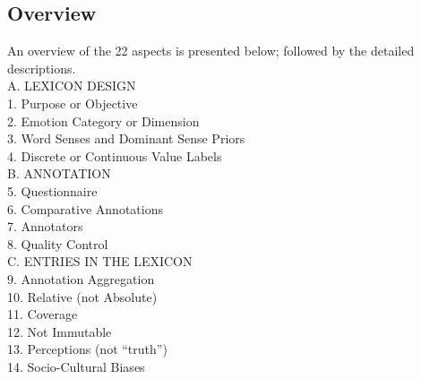 \documentclass[11pt]{article}
\begin{document}
\subsection{Overview}

\noindent An overview of the 22 aspects is presented below; followed by the detailed descriptions.\\[-10pt] %

\noindent A. LEXICON DESIGN\\[2pt]
\hspace*{3mm}  1. Purpose or Objective\\
\hspace*{3mm}  2. Emotion Category or Dimension\\
\hspace*{3mm}  3. Word Senses and Dominant Sense Priors\\
\hspace*{3mm}  4. Discrete or Continuous Value Labels\\[4pt]
\noindent B. ANNOTATION\\[2pt]
\hspace*{3mm}  5. Questionnaire\\[2pt]
\hspace*{3mm}  6. Comparative Annotations\\ %
\hspace*{3mm}  7. Annotators\\
\hspace*{3mm}  8. Quality Control \\ %
\noindent C. ENTRIES IN THE LEXICON\\[2pt]
\hspace*{3mm}  9. Annotation Aggregation\\%
\hspace*{3mm}  10. Relative (not Absolute)\\
\hspace*{3mm}  11. Coverage\\
\hspace*{3mm}  12. Not Immutable\\
\hspace*{3mm}  13. Perceptions (not ``truth'')\\
\hspace*{3mm}  14. Socio-Cultural Biases\\
\end{document}
